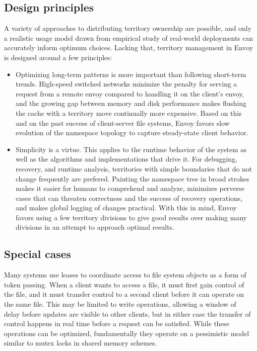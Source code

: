 \subsection{Design principles}

A variety of approaches to distributing territory ownership are possible, and only a realistic usage model drawn from empirical study of real-world deployments can accurately inform optimum choices. Lacking that, territory management in Envoy is designed around a few principles:

\begin{itemize}
\item Optimizing long-term patterns is more important than following short-term trends. High-speed switched networks minimize the penalty for serving a request from a remote envoy compared to handling it on the client's envoy, and the growing gap between memory and disk performance makes flushing the cache with a territory move continually more expensive. Based on this and on the past success of client-server file systems, Envoy favors slow evolution of the namespace topology to capture steady-state client behavior.

\item Simplicity is a virtue. This applies to the runtime behavior of the system as well as the algorithms and implementations that drive it. For debugging, recovery, and runtime analysis, territories with simple boundaries that do not change frequently are prefered. Painting the namespace tree in broad strokes makes it easier for humans to comprehend and analyze, minimizes perverse cases that can threaten correctness and the success of recovery operations, and makes global logging of changes practical. With this in mind, Envoy favors using a few territory divisions to give good results over making many divisions in an attempt to approach optimal results.
\end{itemize}

\subsection{Special cases}

Many systems use leases to coordinate access to file system objects as a form of token passing. When a client wants to access a file, it must first gain control of the file, and it must transfer control to a second client before it can operate on the same file. This may be limited to write operations, allowing a window of delay before updates are visible to other clients, but in either case the transfer of control happens in real time before a request can be satisfied. While these operations can be optimized, fundamentally they operate on a pessimistic model similar to mutex locks in shared memory schemes.

